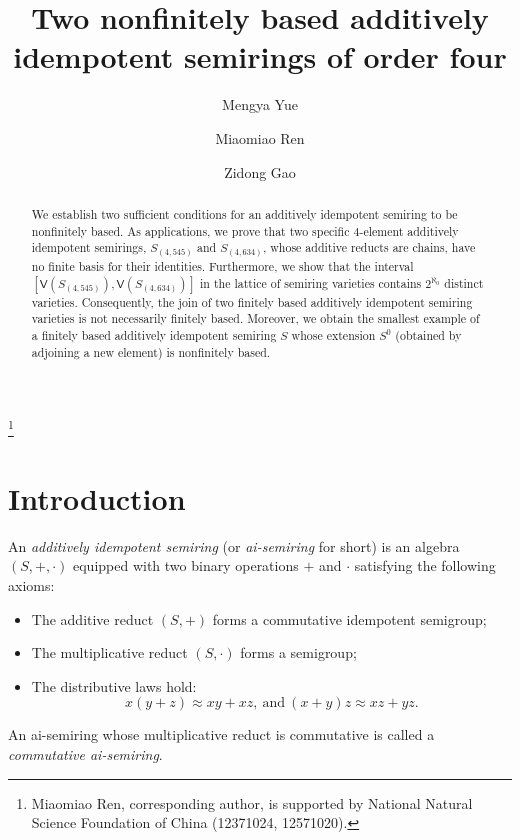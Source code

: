 \documentclass[reqno]{amsart}
\theoremstyle{plain}
\theoremstyle{definition}
\begin{document}
\title[The additively idempotent semirings]
{Two nonfinitely based additively idempotent semirings of order four}

\author{Mengya Yue}
\address{School of Mathematics, Northwest University, Xi'an, 710127, Shaanxi, P.R. China}

\author{Miaomiao Ren}
\address{School of Mathematics, Northwest University, Xi'an, 710127, Shaanxi, P.R. China}

\author{Zidong Gao}
\address{School of Mathematics, Northwest University, Xi'an, 710127, Shaanxi, P.R. China}



\thanks{Miaomiao Ren, corresponding author, is supported by National Natural Science Foundation of China (12371024, 12571020).
}




\begin{abstract}
We establish two sufficient conditions for an additively idempotent semiring to be nonfinitely based.
As applications,
we prove that two specific $4$-element additively idempotent semirings,
$S_{(4,545)}$ and $S_{(4,634)}$, whose additive reducts are chains,
have no finite basis for their identities.
Furthermore, we show that the interval $[\mathsf{V}(S_{(4,545)}),\mathsf{V}(S_{(4,634)})]$
in the lattice of semiring varieties contains \(2^{\aleph_0}\) distinct varieties.
Consequently, the join of two finitely based additively idempotent semiring varieties is not necessarily finitely based.
Moreover, we obtain the smallest example of a finitely based additively idempotent semiring $S$
whose extension $S^0$ (obtained by adjoining a new element) is nonfinitely based.
\end{abstract}



\maketitle

\section{Introduction}
An \emph{additively idempotent semiring} (or \emph{ai-semiring} for short)
is an algebra $(S, +, \cdot)$ equipped with two binary operations $+$ and $\cdot$ satisfying the following axioms:
\begin{itemize}
\item The additive reduct $(S, +)$ forms a commutative idempotent semigroup;

\item The multiplicative reduct $(S, \cdot)$ forms a semigroup;

\item The distributive laws hold:
\[
x(y+z)\approx xy+xz,~\text{and}~(x+y)z\approx xz+yz.
\]
\end{itemize}
An ai-semiring whose multiplicative reduct is commutative is called a \emph{commutative ai-semiring}.
\end{document}
